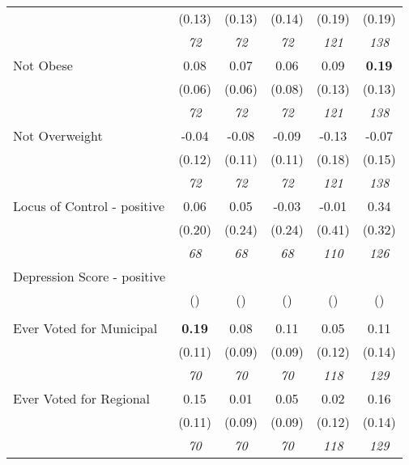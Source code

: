 \begin{tabular}{l c c c c c}
& (0.13) & (0.13) & (0.14) & (0.19) & (0.19) \\
& \textit{ 72 } & \textit{ 72 } & \textit{ 72 } & \textit{ 121 } & \textit{ 138 } \\
Not Obese & 0.08 & 0.07 & 0.06 & 0.09 & \textbf{ 0.19 } \\
& (0.06) & (0.06) & (0.08) & (0.13) & (0.13) \\
& \textit{ 72 } & \textit{ 72 } & \textit{ 72 } & \textit{ 121 } & \textit{ 138 } \\
Not Overweight & -0.04 & -0.08 & -0.09 & -0.13 & -0.07 \\
& (0.12) & (0.11) & (0.11) & (0.18) & (0.15) \\
& \textit{ 72 } & \textit{ 72 } & \textit{ 72 } & \textit{ 121 } & \textit{ 138 } \\
Locus of Control - positive & 0.06 & 0.05 & -0.03 & -0.01 & 0.34 \\
& (0.20) & (0.24) & (0.24) & (0.41) & (0.32) \\
& \textit{ 68 } & \textit{ 68 } & \textit{ 68 } & \textit{ 110 } & \textit{ 126 } \\
Depression Score - positive & & & & & \\
& () & () & () & () & () \\
& & & & & \\
Ever Voted for Municipal & \textbf{ 0.19 } & 0.08 & 0.11 & 0.05 & 0.11 \\
& (0.11) & (0.09) & (0.09) & (0.12) & (0.14) \\
& \textit{ 70 } & \textit{ 70 } & \textit{ 70 } & \textit{ 118 } & \textit{ 129 } \\
Ever Voted for Regional & 0.15 & 0.01 & 0.05 & 0.02 & 0.16 \\
& (0.11) & (0.09) & (0.09) & (0.12) & (0.14) \\
& \textit{ 70 } & \textit{ 70 } & \textit{ 70 } & \textit{ 118 } & \textit{ 129 } \\
\bottomrule
\end{tabular}
